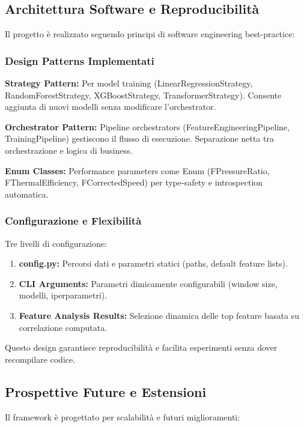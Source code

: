 \subsection{Architettura Software e Reproducibilità}

Il progetto è realizzato seguendo principi di software engineering best-practice:

\subsubsection{Design Patterns Implementati}

\textbf{Strategy Pattern:} Per model training (LinearRegressionStrategy, RandomForestStrategy, XGBoostStrategy, TransformerStrategy). Consente aggiunta di nuovi modelli senza modificare l'orchestrator.

\textbf{Orchestrator Pattern:} Pipeline orchestrators (FeatureEngineeringPipeline, TrainingPipeline) gestiscono il flusso di esecuzione. Separazione netta tra orchestrazione e logica di business.

\textbf{Enum Classes:} Performance parameters come Enum (FPressureRatio, FThermalEfficiency, FCorrectedSpeed) per type-safety e introspection automatica.

\subsubsection{Configurazione e Flexibilità}

Tre livelli di configurazione:
\begin{enumerate}
    \item \textbf{config.py:} Percorsi dati e parametri statici (paths, default feature lists).
    \item \textbf{CLI Arguments:} Parametri dimicamente configurabili (window size, modelli, iperparametri).
    \item \textbf{Feature Analysis Results:} Selezione dinamica delle top feature basata su correlazione computata.
\end{enumerate}

Questo design garantisce reproducibilità e facilita esperimenti senza dover recompilare codice.

\subsection{Prospettive Future e Estensioni}

Il framework è progettato per scalabilità e futuri miglioramenti:

